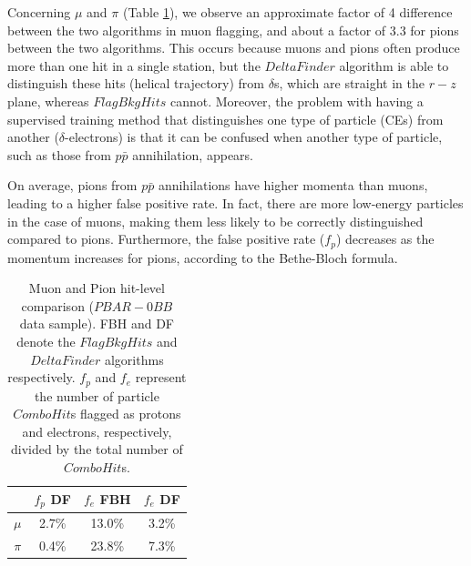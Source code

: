       Concerning $\mu$ and $\pi$ (Table \ref{tab:0bbpbar}), 
      we observe an approximate factor of 
      4 difference between the two algorithms 
      in muon flagging, and about a factor 
      of 3.3 for pions 
      between the two algorithms. This occurs because 
      muons and pions often produce more than one 
      hit in a single station, but the 
      $DeltaFinder$ algorithm is able to 
      distinguish these hits (helical 
      trajectory) from $\delta$s, which are 
      straight in the $r-z$ plane, whereas 
      $FlagBkgHits$ cannot. Moreover, the 
      problem with having a supervised 
      training method that distinguishes 
      one type of particle (CEs) from 
      another ($\delta$-electrons)
      is that it can be confused when 
      another type of particle, such as 
      those from $p\bar{p}$ annihilation, appears. 
      
      On average, pions from $p\bar{p}$ annihilations  
      have higher 
      momenta than muons, leading to a 
      higher false positive rate. In fact, 
      there are more low-energy particles 
      in the case of muons, making them 
      less likely to be correctly 
      distinguished compared to pions. Furthermore, 
      the false positive rate ($f_p$) decreases 
      as the momentum increases for pions, 
      according to the Bethe-Bloch formula.

    \begin{center}
        \begin{table}[h!]
        \centering
        \renewcommand{\arraystretch}{1.}
        \begin{tabular}{| c | c | c | c|} 
        \hline
         &  $f_{p}$ DF &  $f_{e}$ FBH & $f_{e}$ DF\\
        \hline
        $\mu$  &  2.7\%  & 13.0\% & 3.2\%\\
        \hline
        $\pi$ & 0.4\% & 23.8\%& 7.3\%\\
        \hline
        \end{tabular}
        \caption{Muon and Pion 
        hit-level comparison ($PBAR-0BB$ data sample). FBH and DF denote 
        the $FlagBkgHits$ and $DeltaFinder$ algorithms respectively. $f_p$ and $f_e$ represent 
        the number of particle $ComboHit$s flagged as protons and electrons, respectively, 
        divided by the total number of $ComboHit$s.}
        \label{tab:0bbpbar}
        \end{table}
        \end{center}


